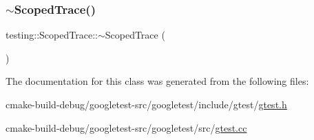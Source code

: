 \subsubsection{\texorpdfstring{$\sim$ScopedTrace()}{~ScopedTrace()}}
{\footnotesize\ttfamily testing\+::\+Scoped\+Trace\+::$\sim$\+Scoped\+Trace (\begin{DoxyParamCaption}{ }\end{DoxyParamCaption})}



The documentation for this class was generated from the following files\+:\begin{DoxyCompactItemize}
\item 
cmake-\/build-\/debug/googletest-\/src/googletest/include/gtest/\mbox{\hyperlink{gtest_8h}{gtest.\+h}}\item 
cmake-\/build-\/debug/googletest-\/src/googletest/src/\mbox{\hyperlink{gtest_8cc}{gtest.\+cc}}\end{DoxyCompactItemize}
